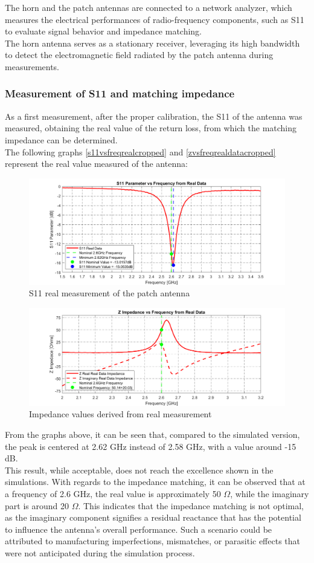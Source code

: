\documentclass[]{article}
\begin{document}
The horn and the patch antennas are connected to a network analyzer, which measures the electrical performances of radio-frequency components, such as S11 to evaluate signal behavior and impedance matching.\\
The horn antenna serves as a stationary receiver, leveraging its high bandwidth to detect the electromagnetic field radiated by the patch antenna during measurements.\\
\subsubsection{Measurement of S11 and matching impedance}
As a first measurement, after the proper calibration, the S11 of the antenna was measured, obtaining the real value of the return loss, from which the matching impedance can be determined.\\
The following graphs \eqref{s11vsfreqrealcropped} and \eqref{zvsfreqrealdatacropped} represent the real value measured of the antenna: 
\begin{figure}[H]
	\centering
	\includegraphics[width=0.7\linewidth]{img/S11_vs_freq_real_cropped}
	\caption{S11 real measurement of the patch antenna}
	\label{s11vsfreqrealcropped}
\end{figure}

\begin{figure}[h]
	\centering
	\includegraphics[width=0.7\linewidth]{img/Z_vs_freq_real_data_cropped}
	\caption{Impedance values derived from real measurement }
	\label{zvsfreqrealdatacropped}
\end{figure}

From the graphs above, it can be seen that, compared to the simulated version, the peak is centered at 2.62 GHz instead of 2.58 GHz, with a value around -15 dB.\\
This result, while acceptable, does not reach the excellence shown in the simulations. With regards to the impedance matching, it can be observed that at a frequency of 2.6 GHz, the real value is approximately 50 $\Omega$, while the imaginary part is around 20 $\Omega$. This indicates that the impedance matching is not optimal, as the imaginary component signifies a residual reactance that has the potential to influence the antenna's overall performance. Such a scenario could be attributed to manufacturing imperfections, mismatches, or parasitic effects that were not anticipated during the simulation process. 
\end{document}
